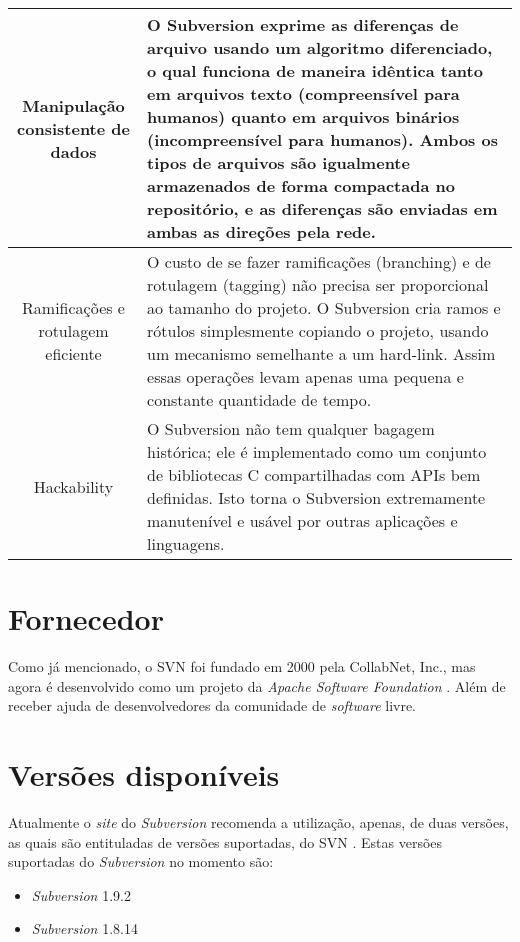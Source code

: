 \begin{center}
\begin{longtable}{|c| p{10cm} |}
  \hline
  Manipulação consistente de dados & O Subversion exprime as diferenças de arquivo usando um algoritmo diferenciado, o qual funciona de maneira idêntica tanto em arquivos texto (compreensível para humanos) quanto em arquivos binários (incompreensível para humanos). Ambos os tipos de arquivos são igualmente armazenados de forma compactada no repositório, e as diferenças são enviadas em ambas as direções pela rede.\\
  \hline
  Ramificações e rotulagem eficiente & O custo de se fazer ramificações (branching) e de rotulagem (tagging) não precisa ser proporcional ao tamanho do projeto. O Subversion cria ramos e rótulos simplesmente copiando o projeto, usando um mecanismo semelhante a um hard-link. Assim essas operações levam apenas uma pequena e constante quantidade de tempo.\\
  \hline
  Hackability & O Subversion não tem qualquer bagagem histórica; ele é implementado como um conjunto de bibliotecas C compartilhadas com APIs bem definidas. Isto torna o Subversion extremamente manutenível e usável por outras aplicações e linguagens.\\
  \hline
  \end{longtable}
  \end{center}

\section{Fornecedor}

  Como já mencionado, o SVN foi fundado em 2000 pela CollabNet, Inc., mas agora é desenvolvido como um projeto da \textit{Apache Software Foundation} \cite{svn-site-home}. Além de receber ajuda de desenvolvedores da comunidade de \textit{software} livre.

\section{Versões disponíveis}

  Atualmente o \textit{site} do \textit{Subversion} recomenda a utilização, apenas, de duas versões, as quais são entituladas de versões suportadas, do SVN \cite{svn-site}. Estas versões suportadas do \textit{Subversion} no momento são:

  \begin{itemize}
    \item \textit{Subversion} 1.9.2 \footnotemark {}

    \item \textit{Subversion} 1.8.14 \footnotemark {}

  \end{itemize}

